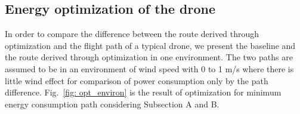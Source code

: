 \documentclass[journal]{./template/IEEEtran}
\begin{document}
\subsection{Energy optimization of the drone}

In order to compare the difference between the route derived through optimization and the flight path of a typical drone, we present the baseline and the route derived through optimization in one environment.
The two paths are assumed to be in an environment of wind speed with 0 to 1 m/s where there is little wind effect for comparison of power consumption only by the path difference.
Fig.~\ref{fig: opt_environ} is the result of optimization for minimum energy consumption path considering Subsection A and B.
\end{document}
